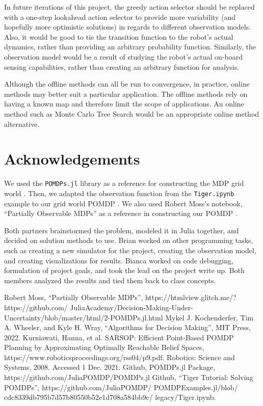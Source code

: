 \documentclass{article}
\begin{document}
In future iterations of this project, the greedy action selector should be replaced with a one-step lookahead action selector to provide more variability (and hopefully more optimistic solutions) in regards to different observation models. Also, it would be good to tie the transition function to the robot's actual dynamics, rather than providing an arbitrary probability function. Similarly, the observation model would be a result of studying the robot's actual on-board sensing capabilities, rather than creating an arbitrary function for analysis.

Although the offline methods can all be run to convergence, in practice, online methods may better suit a particular application.  The offline methods rely on having a known map and therefore limit the scope of applications. An online method such as Monte Carlo Tree Search would be an appropriate online method alternative.

\section*{Acknowledgements}
We used the \verb!POMDPs.jl! library as a reference for constructing the MDP grid world \cite{POMDPs.jl}.  Then, we adapted the observation function from the \verb!Tiger.ipynb! example to our grid world POMDP \cite{tiger}.  We also used Robert Moss's notebook, ``Partially Observable MDPs'' as a reference in constructing our POMDP \cite{POMDP Robert}.

Both partners brainstormed the problem, modeled it in Julia together, and decided on solution methods to use. Brian worked on other programming tasks, such as creating a new simulator for the project, creating the observation model, and creating visualizations for results.  Bianca worked on code debugging, formulation of project goals, and took the lead on the project write up.  Both members analyzed the results and tied them back to class concepts.

\begin{thebibliography}{}
 Robert Moss, ``Partially Observable MDPs'', https://htmlview.glitch.me/?https://github.com/
JuliaAcademy/Decision-Making-Under-Uncertainty/blob/master/html/2-POMDPs.jl.html
 Mykel J. Kochenderfer, Tim A. Wheeler, and Kyle H. Wray, ``Algorithms for Decision Making'', MIT Press, 2022.
 Kurniawati, Hanna, et al. SARSOP: Efficient Point-Based POMDP Planning by Approximating Optimally Reachable Belief Spaces, https://www.roboticsproceedings.org/rss04/p9.pdf. Robotics: Science and Systems, 2008. Accessed 1 Dec. 2021. 
 Github, POMDPs.jl Package, https://github.com/JuliaPOMDP/POMDPs.jl
 Github, ``Tiger Tutorial: Solving POMDPs'', https://github.com/JuliaPOMDP/
POMDPExamples.jl/blob/
cdc8339db795b7d57b80550b52e1d708a584bb9c/
legacy/Tiger.ipynb.
\end{thebibliography}
\end{document}
